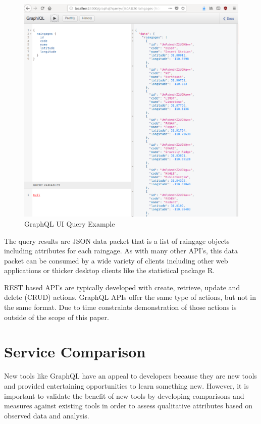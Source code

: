 \begin{figure}[htb]
  \centering\includegraphics[width=\columnwidth]
  {./images/graphql_rgs.png}
  \caption{GraphQL UI Query Example}\label{f:graphql_rgs}
\end{figure}

The query results are JSON data packet that is a list of raingage objects 
including attributes for each raingage.  As with many other API's, this data 
packet can be consumed by a wide variety of clients including other web 
applications or thicker desktop clients like the statistical package R.

REST based API's are typically developed with create, retrieve, update and 
delete (CRUD) actions.  GraphQL APIs offer the same type of actions, but 
not in the same format.  Due to time constraints demonstration of those 
actions is outside of the scope of this paper.

\section{Service Comparison}
New tools like GraphQL have an appeal to developers because they are new tools 
and provided entertaining opportunities to learn something new.  However, it 
is important to validate the benefit of new tools by developing comparisons 
and measures against existing tools in order to assess qualitative attributes 
based on observed data and analysis.

